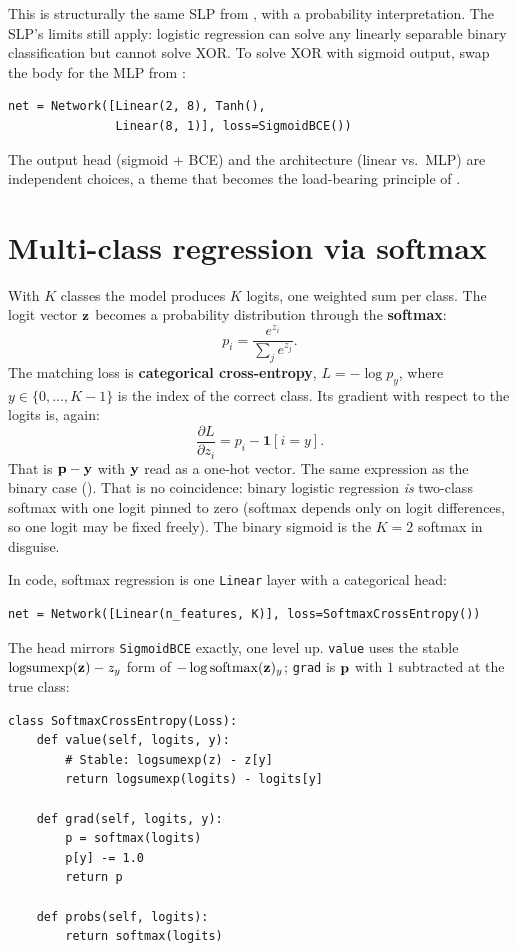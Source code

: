 This is structurally the same SLP from , with a
probability interpretation. The SLP's limits still apply: logistic
regression can solve any linearly separable binary classification but
cannot solve XOR. To solve XOR with sigmoid output, swap the body for
the MLP from :
\begin{lstlisting}
net = Network([Linear(2, 8), Tanh(),
               Linear(8, 1)], loss=SigmoidBCE())
\end{lstlisting}
The output head (sigmoid + BCE) and the architecture (linear vs.~MLP)
are independent choices, a theme that becomes the load-bearing principle
of .

\section{Multi-class regression via softmax}\label{sec:softmax}

With $K$ classes the model produces $K$ logits, one weighted sum per
class. The logit vector $\mathbf{z}$ becomes a probability distribution through
the \textbf{softmax}:
\[
  p_i = \frac{e^{z_i}}{\sum_j e^{z_j}}.
\]
The matching loss is \textbf{categorical cross-entropy}, $L = -\log p_y$,
where $y \in \{0, \ldots, K-1\}$ is the index of the correct class. Its
gradient with respect to the logits is, again:
\begin{equation}\label{eq:py-softmax}
  \frac{\partial L}{\partial z_i} = p_i - \mathbf{1}[i = y].
\end{equation}
That is $\mathbf{p} - \mathbf{y}$ with $\mathbf{y}$ read as a one-hot vector. The same
expression as the binary case (). That is no
coincidence: binary logistic regression \emph{is} two-class softmax with
one logit pinned to zero (softmax depends only on logit differences, so
one logit may be fixed freely). The binary sigmoid is the $K = 2$
softmax in disguise.

In code, softmax regression is one \texttt{Linear} layer with a
categorical head:
\begin{lstlisting}
net = Network([Linear(n_features, K)], loss=SoftmaxCrossEntropy())
\end{lstlisting}
The head mirrors \texttt{SigmoidBCE} exactly, one level up. \texttt{value}
uses the stable $\mathrm{logsumexp}(\mathbf{z}) - z_y$ form of
$-\log \mathrm{softmax}(\mathbf{z})_y$; \texttt{grad} is $\mathbf{p}$ with $1$
subtracted at the true class:

\begin{lstlisting}
class SoftmaxCrossEntropy(Loss):
    def value(self, logits, y):
        # Stable: logsumexp(z) - z[y]
        return logsumexp(logits) - logits[y]

    def grad(self, logits, y):
        p = softmax(logits)
        p[y] -= 1.0
        return p

    def probs(self, logits):
        return softmax(logits)
\end{lstlisting}

